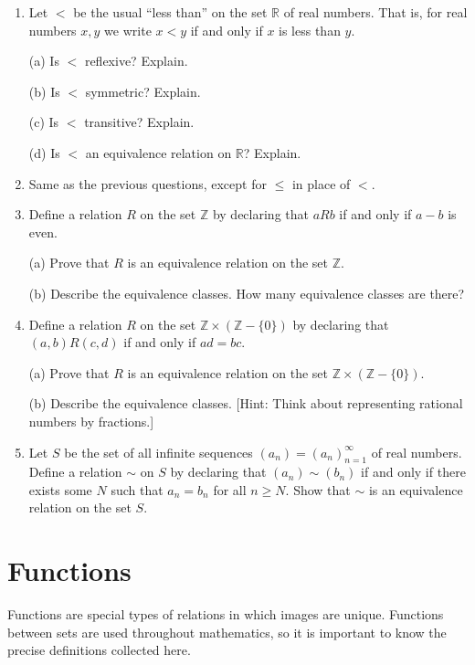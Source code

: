 \documentclass[11pt]{article}
\newenvironment{problems}
{
 \begin{enumerate}[topsep=1pt,itemsep=0pt,parsep=2pt,leftmargin=0.6cm,%
 label={\arabic*.}, ref=\arabic*] \small
}
{
 \end{enumerate}
}
\theoremstyle{definition}
\newcommand{\R}{\mathbb{R}} %
\newcommand{\Z}{\mathbb{Z}} %
\begin{document}
\begin{problems}

\item Let $<$ be the usual ``less than'' on the set $\R$ of real
  numbers. That is, for real numbers $x,y$ we write $x<y$ if and only
  if $x$ is less than $y$. 

  (a) Is $<$ reflexive? Explain.

  (b) Is $<$ symmetric? Explain.

  (c) Is $<$ transitive? Explain.

  (d) Is $<$ an equivalence relation on $\R$? Explain.

\item Same as the previous questions, except for $\le$ in place of $<$.


\item Define a relation $R$ on the set $\Z$ by declaring that $a R b$
  if and only if $a-b$ is even.

  (a) Prove that $R$ is an equivalence relation on the set $\Z$.  

  (b) Describe the equivalence classes. How many equivalence classes
  are there?


\item Define a relation $R$ on the set $\Z \times (\Z-\{0\})$ by
  declaring that $(a,b) R (c,d)$ if and only if $ad=bc$.  

  (a) Prove that $R$ is an equivalence relation on the set $\Z \times
  (\Z-\{0\})$.  

  (b) Describe the equivalence classes. [Hint: Think about
    representing rational numbers by fractions.]



\item Let $S$ be the set of all infinite sequences
  $(a_n)=(a_n)_{n=1}^\infty$ of real numbers. Define a relation $\sim$
  on $S$ by declaring that $(a_n) \sim (b_n)$ if and only if there
  exists some $N$ such that $a_n = b_n$ for all $n\ge N$.  Show that
  $\sim$ is an equivalence relation on the set $S$.

\end{problems}




\newpage\section{Functions}\noindent 
Functions are special types of relations in which
images are unique.  Functions between sets are used throughout
mathematics, so it is important to know the precise definitions
collected here.
\end{document}

